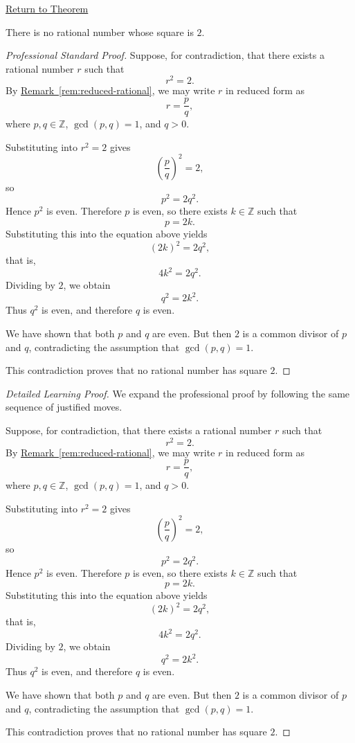 \newpage
{}
\label{prf:sqrt2-irrational}

\begin{remark*}[Return]
\hyperref[thm:sqrt2-irrational]{Return to Theorem}
\end{remark*}

\begin{theorem*}
There is no rational number whose square is $2$.
\end{theorem*}

\begin{proof}[Professional Standard Proof]
\LRAProofBodyStart
Suppose, for contradiction, that there exists a rational number $r$ such that
\[
r^2=2.
\]
By \hyperref[rem:reduced-rational]{Remark~\ref*{rem:reduced-rational}}, we may
write $r$ in reduced form as
\[
r=\frac{p}{q},
\]
where $p,q\in\mathbb{Z}$, $\gcd(p,q)=1$, and $q>0$.

Substituting into $r^2=2$ gives
\[
\left(\frac{p}{q}\right)^2=2,
\]
so
\[
p^2=2q^2.
\]
Hence $p^2$ is even. Therefore $p$ is even, so there exists $k\in\mathbb{Z}$
such that
\[
p=2k.
\]
Substituting this into the equation above yields
\[
(2k)^2=2q^2,
\]
that is,
\[
4k^2=2q^2.
\]
Dividing by $2$, we obtain
\[
q^2=2k^2.
\]
Thus $q^2$ is even, and therefore $q$ is even.

We have shown that both $p$ and $q$ are even. But then $2$ is a common divisor
of $p$ and $q$, contradicting the assumption that $\gcd(p,q)=1$.

This contradiction proves that no rational number has square $2$.
\end{proof}

\begin{proof}[Detailed Learning Proof]
\LRAProofBodyStart
We expand the professional proof by following the same sequence of justified moves.

Suppose, for contradiction, that there exists a rational number $r$ such that
\[
r^2=2.
\]
By \hyperref[rem:reduced-rational]{Remark~\ref*{rem:reduced-rational}}, we may
write $r$ in reduced form as
\[
r=\frac{p}{q},
\]
where $p,q\in\mathbb{Z}$, $\gcd(p,q)=1$, and $q>0$.

Substituting into $r^2=2$ gives
\[
\left(\frac{p}{q}\right)^2=2,
\]
so
\[
p^2=2q^2.
\]
Hence $p^2$ is even. Therefore $p$ is even, so there exists $k\in\mathbb{Z}$
such that
\[
p=2k.
\]
Substituting this into the equation above yields
\[
(2k)^2=2q^2,
\]
that is,
\[
4k^2=2q^2.
\]
Dividing by $2$, we obtain
\[
q^2=2k^2.
\]
Thus $q^2$ is even, and therefore $q$ is even.

We have shown that both $p$ and $q$ are even. But then $2$ is a common divisor
of $p$ and $q$, contradicting the assumption that $\gcd(p,q)=1$.

This contradiction proves that no rational number has square $2$.
\end{proof}

